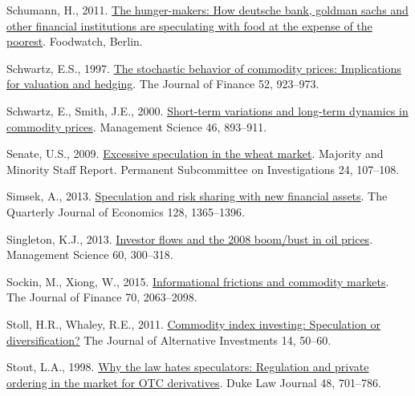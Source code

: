 \documentclass[]{elsarticle} %
\newlength{\cslhangindent}
\newlength{\cslentryspacingunit} %
\newenvironment{CSLReferences}[2] %
 {%
  \setlength{\parindent}{0pt}
  \ifodd #1
  \let\oldpar\par
  \def\par{\hangindent=\cslhangindent\oldpar}
  \fi
  \setlength{\parskip}{#2\cslentryspacingunit}
 }%
 {}
\begin{document}
\begin{CSLReferences}{1}{0}
\leavevmode{}%
Schumann, H., 2011. \href{https://www.foodwatch.org/uploads/media/foodwatchreport_TheHungerMakers_observationsandcallsforaction_ger_03.pdf}{The hunger-makers: How deutsche bank, goldman sachs and other financial institutions are speculating with food at the expense of the poorest}. Foodwatch, Berlin.

\leavevmode{}%
Schwartz, E.S., 1997. \href{https://doi.org/10.1111/j.1540-6261.1997.tb02721.x}{The stochastic behavior of commodity prices: Implications for valuation and hedging}. The Journal of Finance 52, 923--973.

\leavevmode{}%
Schwartz, E., Smith, J.E., 2000. \href{https://www.jstor.org/stable/2661607}{Short-term variations and long-term dynamics in commodity prices}. Management Science 46, 893--911.

\leavevmode{}%
Senate, U.S., 2009. \href{https://www.hsgac.senate.gov/imo/media/doc/REPORTExcessiveSpecullationintheWheatMarketwoexhibitschartsJune2409.pdf?attempt=2}{Excessive speculation in the wheat market}. Majority and Minority Staff Report. Permanent Subcommittee on Investigations 24, 107--108.

\leavevmode{}%
Simsek, A., 2013. \href{https://doi.org/10.1093/qje/qjt007}{Speculation and risk sharing with new financial assets}. The Quarterly Journal of Economics 128, 1365--1396.

\leavevmode{}%
Singleton, K.J., 2013. \href{https://doi.org/10.1287/mnsc.2013.1756}{Investor flows and the 2008 boom/bust in oil prices}. Management Science 60, 300--318.

\leavevmode{}%
Sockin, M., Xiong, W., 2015. \href{https://doi.org/10.1111/jofi.12261}{Informational frictions and commodity markets}. The Journal of Finance 70, 2063--2098.

\leavevmode{}%
Stoll, H.R., Whaley, R.E., 2011. \href{https://doi.org/10.2139/ssrn.1633908}{Commodity index investing: Speculation or diversification?} The Journal of Alternative Investments 14, 50--60.

\leavevmode{}%
Stout, L.A., 1998. \href{https://doi.org/10.2307/1373070}{Why the law hates speculators: Regulation and private ordering in the market for OTC derivatives}. Duke Law Journal 48, 701--786.


\end{CSLReferences}
\end{document}
